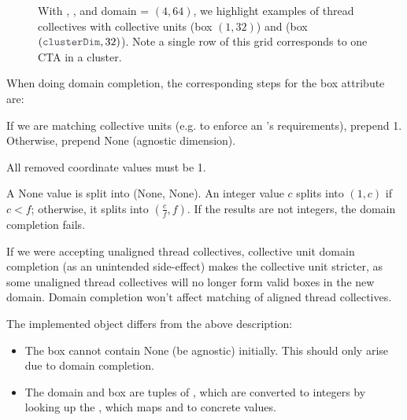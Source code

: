 \begin{figure*}[!b]
\caption{With , , and domain = $(4, 64)$, we highlight examples of thread collectives with collective units  (box $(1, 32)$) and  (box $(\lighttt{clusterDim}, 32)$). Note a single row of this grid corresponds to one CTA in a cluster.}
\label{fig:units}
\end{figure*}

\filbreak
{}

When doing domain completion, the corresponding steps for the box attribute are:

\filbreak
{} If we are matching collective units (e.g. to enforce an 's requirements), prepend 1.
Otherwise, prepend None (agnostic dimension).

\filbreak
{} All removed coordinate values must be 1.

\filbreak
{} A None value is split into (None, None).
An integer value $c$ splits into $(1, c)$ if $c < f$; otherwise, it splits into $(\frac{c}{f}, f)$.
If the results are not integers, the domain completion fails.

\filbreak
If we were accepting unaligned thread collectives, collective unit domain completion (as an unintended side-effect) makes the collective unit stricter, as some unaligned thread collectives will no longer form valid boxes in the new domain.
Domain completion won't affect matching of aligned thread collectives.

\filbreak
{}

The implemented  object differs from the above description:

\filbreak
\begin{itemize}
\item The box cannot contain None (be agnostic) initially. This should only arise due to domain completion.
\filbreak
\item The domain and box are tuples of , which are converted to integers by looking up the , which maps  and  to concrete values.
\end{itemize}


